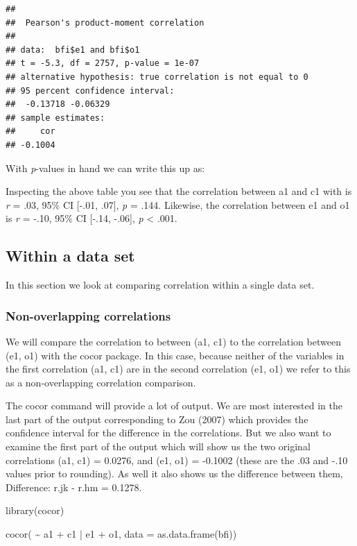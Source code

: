 \documentclass[
]{krantz}
\makeatletter
\newenvironment{Shaded}{\begin{snugshade}}{\end{snugshade}}
\newcommand{\AttributeTok}[1]{\textcolor[rgb]{0.61,0.61,0.61}{#1}}
\newcommand{\FunctionTok}[1]{\textcolor[rgb]{0,0,0}{#1}}
\newcommand{\NormalTok}[1]{#1}
\newcommand{\SpecialCharTok}[1]{\textcolor[rgb]{0,0,0}{#1}}
\newenvironment{kframe}{%
\medskip{}
\setlength{\fboxsep}{.8em}
 \def\at@end@of@kframe{}%
 \ifinner\ifhmode%
  \def\at@end@of@kframe{\end{minipage}}%
  \begin{minipage}{\columnwidth}%
 \fi\fi%
 \def\FrameCommand##1{\hskip\@totalleftmargin \hskip-\fboxsep
 \colorbox{shadecolor}{##1}\hskip-\fboxsep
     \hskip-\linewidth \hskip-\@totalleftmargin \hskip\columnwidth}%
 \MakeFramed {\advance\hsize-\width
   \@totalleftmargin\z@ \linewidth\hsize
   \@setminipage}}%
 {\par\unskip\endMakeFramed%
 \at@end@of@kframe}
\renewenvironment{Shaded}{\begin{kframe}}{\end{kframe}}
\makeatother
\begin{document}
\begin{verbatim}
## 
##  Pearson's product-moment correlation
## 
## data:  bfi$e1 and bfi$o1
## t = -5.3, df = 2757, p-value = 1e-07
## alternative hypothesis: true correlation is not equal to 0
## 95 percent confidence interval:
##  -0.13718 -0.06329
## sample estimates:
##     cor 
## -0.1004
\end{verbatim}

With \emph{p}-values in hand we can write this up as:

Inspecting the above table you see that the correlation between a1 and c1 with is \emph{r} = .03, 95\% CI {[}-.01, .07{]}, \emph{p} = .144. Likewise, the correlation between e1 and o1 is \emph{r} = -.10, 95\% CI {[}-.14, -.06{]}, \emph{p} \textless{} .001.

\hypertarget{within-a-data-set}{%
\subsection{Within a data set}\label{within-a-data-set}}

In this section we look at comparing correlation within a single data set.

\hypertarget{non-overlapping-correlations}{%
\subsubsection{Non-overlapping correlations}\label{non-overlapping-correlations}}

We will compare the correlation to between (a1, c1) to the correlation between (e1, o1) with the cocor package. In this case, because neither of the variables in the first correlation (a1, c1) are in the second correlation (e1, o1) we refer to this as a non-overlapping correlation comparison.

The cocor command will provide a lot of output. We are most interested in the last part of the output corresponding to Zou (2007) which provides the confidence interval for the difference in the correlations. But we also want to examine the first part of the output which will show us the two original correlations (a1, c1) = 0.0276, and (e1, o1) = -0.1002 (these are the .03 and -.10 values prior to rounding). As well it also shows us the difference between them, Difference: r.jk - r.hm = 0.1278.

\begin{Shaded}
\begin{Highlighting}[]
\FunctionTok{library}\NormalTok{(cocor)}

\FunctionTok{cocor}\NormalTok{( }\SpecialCharTok{\textasciitilde{}}\NormalTok{ a1 }\SpecialCharTok{+}\NormalTok{ c1 }\SpecialCharTok{|}\NormalTok{ e1 }\SpecialCharTok{+}\NormalTok{ o1, }\AttributeTok{data =} \FunctionTok{as.data.frame}\NormalTok{(bfi))}
\end{Highlighting}
\end{Shaded}
\end{document}
